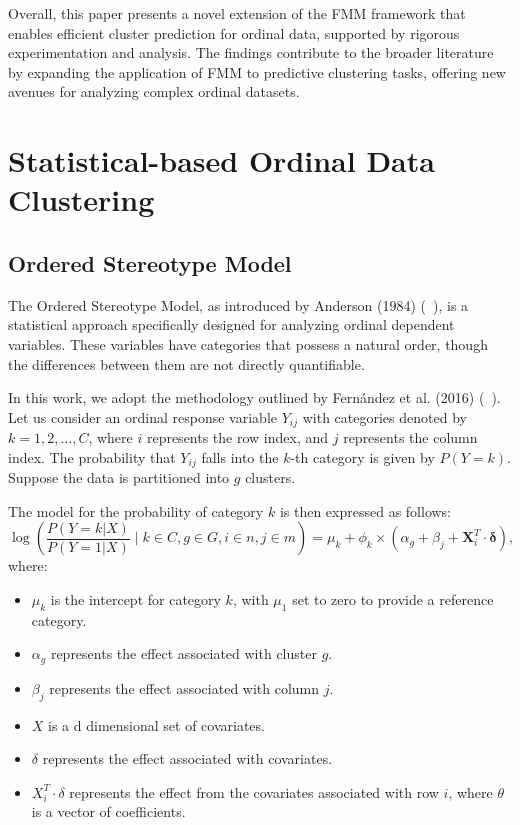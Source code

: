 \documentclass{article}
\begin{document}
Overall, this paper presents a novel extension of the FMM framework that enables efficient cluster prediction for ordinal data, supported by rigorous experimentation and analysis. 
The findings contribute to the broader literature by expanding the application of FMM to predictive clustering tasks, offering new avenues for analyzing complex ordinal datasets.


\section{Statistical-based Ordinal Data Clustering}

\subsection{Ordered Stereotype Model}

The Ordered Stereotype Model, as introduced by Anderson (1984) (~\cite{anderson1984regression}), 
is a statistical approach specifically designed for analyzing ordinal dependent variables. 
These variables have categories that possess a natural order, 
though the differences between them are not directly quantifiable.

In this work, we adopt the methodology outlined by Fernández et al. (2016) (~\cite{fernandez2016mixture}). 
Let us consider an ordinal response variable \(Y_{ij}\) with categories denoted by \(k = 1, 2, \ldots, C\), 
where \(i\) represents the row index, and \(j\) represents the column index. 
The probability that \(Y_{ij}\) falls into the \(k\)-th category is given by \(P(Y = k)\). 
Suppose the data is partitioned into \(g\) clusters.

The model for the probability of category \(k\) is then expressed as follows:
\begin{equation}
  \log\left(\frac{P(Y = k| X)}{P(Y = 1| X)} \mid k \in C, g \in G, i \in n, j \in m\right) = \mu_k + \phi_k \times \left(\alpha_g + \beta_j + \bm{X}_i^T \cdot \bm{\delta} \right),
\end{equation}
where:

\begin{itemize}
    \item \(\mu_k\) is the intercept for category \(k\), with \(\mu_1\) set to zero to provide a reference category.
    \item \(\alpha_g\) represents the effect associated with cluster \(g\).
    \item \(\beta_j\) represents the effect associated with column \(j\).
    \item \(X\) is a d dimensional set of covariates.
    \item \(\delta\) represents the effect associated with covariates.
    \item \(X_i^T \cdot \delta\) represents the effect from the covariates associated with row \(i\), where \(\theta\) is a vector of coefficients.
\end{itemize}
\end{document}

